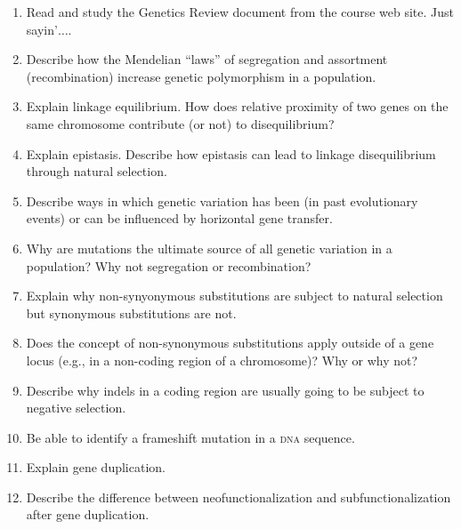 \documentclass[letterpaper]{tufte-handout}
\begin{document}
\begin{enumerate}
	
	\item Read and study the Genetics Review document from the course web site. Just sayin’$\dots$. 
	
	\item Describe how the Mendelian “laws” of segregation and assortment (recombination) increase genetic polymorphism in a population.
	
	\item Explain linkage equilibrium. How does relative proximity of two genes on the same chromosome contribute (or not) to disequilibrium?
	
	\item Explain epistasis. Describe how epistasis can lead to linkage disequilibrium through natural selection.
	
	\item Describe ways in which genetic variation has been (in past evolutionary events) or can be influenced by horizontal gene transfer.
	
	\item Why are mutations the ultimate source of all genetic variation in a population? Why not segregation or recombination?
	
	\item Explain why non-synyonymous substitutions are subject to natural selection but synonymous substitutions are not.
	
	\item Does the concept of non-synonymous substitutions apply outside of a gene locus (e.g., in a non-coding region of a chromosome)? Why or why not?
	
	\item Describe why indels in a coding region are usually going to be subject to negative selection.
	
	\item Be able to identify a frameshift mutation in a \textsc{dna} sequence.
	
	\item Explain gene duplication. 
	
	\item Describe the difference between neofunctionalization and subfunctionalization after gene duplication.
	

\end{enumerate}
\end{document}
